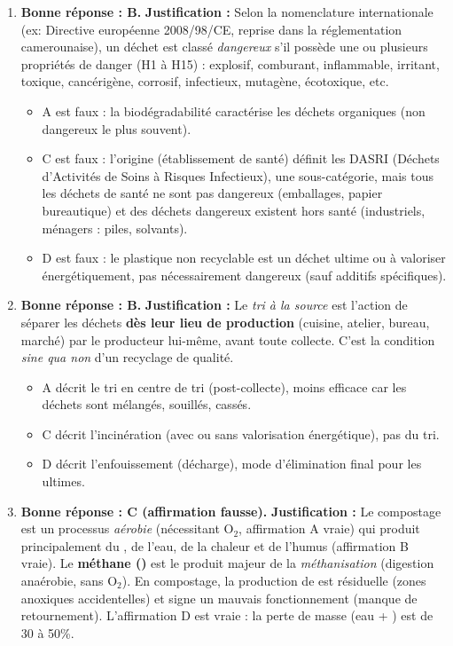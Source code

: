 \documentclass[11pt]{article}
\begin{document}
\begin{corrige}
\begin{enumerate}
    \item \textbf{Bonne réponse : B.}
    \textbf{Justification :} Selon la nomenclature internationale (ex: Directive européenne 2008/98/CE, reprise dans la réglementation camerounaise), un déchet est classé \emph{dangereux} s'il possède une ou plusieurs propriétés de danger (H1 à H15) : explosif, comburant, inflammable, irritant, toxique, cancérigène, corrosif, infectieux, mutagène, écotoxique, etc. 
    \begin{itemize}
        \item A est faux : la biodégradabilité caractérise les déchets organiques (non dangereux le plus souvent).
        \item C est faux : l'origine (établissement de santé) définit les DASRI (Déchets d'Activités de Soins à Risques Infectieux), une sous-catégorie, mais tous les déchets de santé ne sont pas dangereux (emballages, papier bureautique) et des déchets dangereux existent hors santé (industriels, ménagers : piles, solvants).
        \item D est faux : le plastique non recyclable est un déchet ultime ou à valoriser énergétiquement, pas nécessairement dangereux (sauf additifs spécifiques).
    \end{itemize}

    \item \textbf{Bonne réponse : B.}
    \textbf{Justification :} Le \emph{tri à la source} est l'action de séparer les déchets \textbf{dès leur lieu de production} (cuisine, atelier, bureau, marché) par le producteur lui-même, avant toute collecte. C'est la condition \emph{sine qua non} d'un recyclage de qualité.
    \begin{itemize}
        \item A décrit le tri en centre de tri (post-collecte), moins efficace car les déchets sont mélangés, souillés, cassés.
        \item C décrit l'incinération (avec ou sans valorisation énergétique), pas du tri.
        \item D décrit l'enfouissement (décharge), mode d'élimination final pour les ultimes.
    \end{itemize}

    \item \textbf{Bonne réponse : C (affirmation fausse).}
    \textbf{Justification :} Le compostage est un processus \emph{aérobie} (nécessitant O$_2$, affirmation A vraie) qui produit principalement du , de l'eau, de la chaleur et de l'humus (affirmation B vraie). Le \textbf{méthane ()} est le produit majeur de la \emph{méthanisation} (digestion anaérobie, sans O$_2$). En compostage, la production de  est résiduelle (zones anoxiques accidentelles) et signe un mauvais fonctionnement (manque de retournement). L'affirmation D est vraie : la perte de masse (eau + ) est de 30 à 50\%.
\end{enumerate}
\end{corrige}
\end{document}
